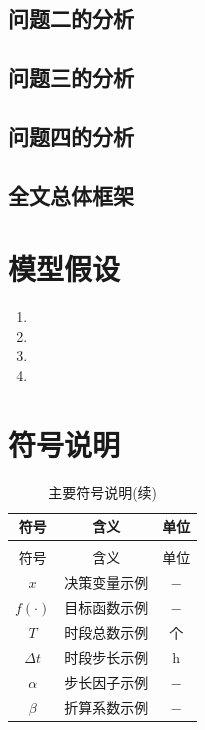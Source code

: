 \documentclass{MathorCupmodeling}
\begin{document}
\subsection{问题二的分析}

\subsection{问题三的分析}

\subsection{问题四的分析}

\subsection{全文总体框架}

\section{模型假设}
\begin{enumerate}[label=\arabic*., wide=0pt, labelsep=0.5em]
	\item %
	\item %
	\item %
	\item %
\end{enumerate}

\section{符号说明}
\begin{longtable}{ccc}
	\caption{主要符号说明}
	\label{tab:symbol}\\
	\toprule[1.5pt]
	符号 & 含义 & 单位 \\
	\midrule
	\endfirsthead
	\caption[]{主要符号说明(续)}\\
	\toprule[1.5pt]
	符号 & 含义 & 单位 \\
	\midrule
	\endhead
	\bottomrule[1.5pt]
	\endfoot
	$x$ & 决策变量示例 & $-$ \\
	$f(\cdot)$ & 目标函数示例 & $-$ \\
	$T$ & 时段总数示例 & 个 \\
	$\Delta t$ & 时段步长示例 & $\mathrm{h}$ \\
	$\alpha$ & 步长因子示例 & $-$ \\
	$\beta$ & 折算系数示例 & $-$ \\
\end{longtable}
\end{document}
